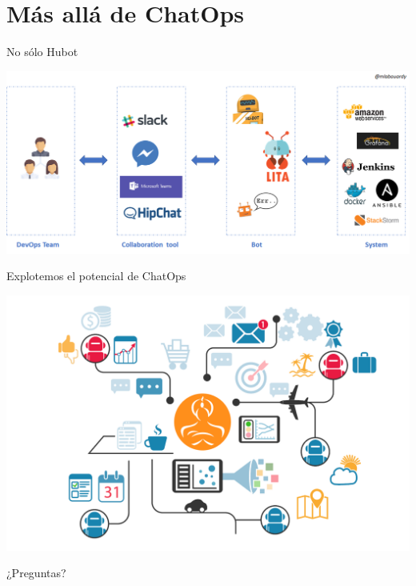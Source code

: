 \documentclass[usenames,dvipsnames]{beamer}
\begin{document}
  \section{Más allá de ChatOps}
  \begin{frame}{No sólo Hubot}
    \begin{center}
      \includegraphics[width=1.0\textwidth]{imgs/chatops2}
    \end{center}
  \end{frame}

  \begin{frame}{Explotemos el potencial de ChatOps}
    \begin{center}
      \includegraphics[width=1.0\textwidth]{imgs/chatops4}
    \end{center}
  \end{frame}

  \begin{frame}[standout]
    ¿Preguntas?
  \end{frame}
\end{document}
